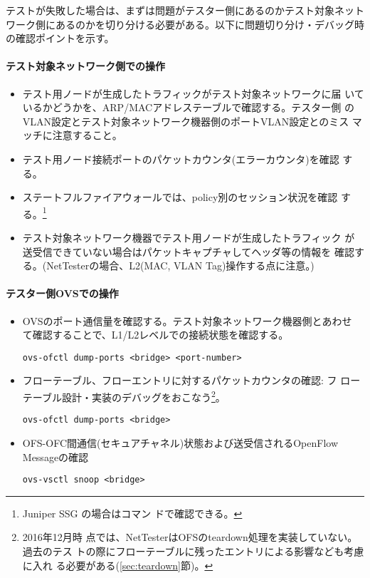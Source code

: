 テストが失敗した場合は、まずは問題がテスター側にあるのかテスト対象ネット
ワーク側にあるのかを切り分ける必要がある。以下に問題切り分け・デバッグ時
の確認ポイントを示す。

    \paragraph{テスト対象ネットワーク側での操作}

\begin{itemize}
 \item テスト用ノードが生成したトラフィックがテスト対象ネットワークに届
       いているかどうかを、ARP/MACアドレステーブルで確認する。テスター側
       のVLAN設定とテスト対象ネットワーク機器側のポートVLAN設定とのミス
       マッチに注意すること。
 \item テスト用ノード接続ポートのパケットカウンタ(エラーカウンタ)を確認
       する。
 \item ステートフルファイアウォールでは、policy別のセッション状況を確認
       する。\footnote{Juniper SSG の場合はコマン
       ドで確認できる。}
 \item テスト対象ネットワーク機器でテスト用ノードが生成したトラフィック
       が送受信できていない場合はパケットキャプチャしてヘッダ等の情報を
       確認する。(NetTesterの場合、L2(MAC, VLAN Tag)操作する点に注意。)
\end{itemize}

    \paragraph{テスター側OVSでの操作}

\begin{itemize}
 \item OVSのポート通信量を確認する。テスト対象ネットワーク機器側とあわせ
       て確認することで、L1/L2レベルでの接続状態を確認する。
\begin{lstlisting}
ovs-ofctl dump-ports <bridge> <port-number>
\end{lstlisting}
 \item フローテーブル、フローエントリに対するパケットカウンタの確認: フ
       ローテーブル設計・実装のデバッグをおこなう\footnote{2016年12月時
       点では、NetTesterはOFSのteardown処理を実装していない。過去のテス
       トの際にフローテーブルに残ったエントリによる影響なども考慮に入れ
       る必要がある(\ref{sec:teardown}節)。}。
\begin{lstlisting}
ovs-ofctl dump-ports <bridge>
\end{lstlisting}
 \item OFS-OFC間通信(セキュアチャネル)状態および送受信されるOpenFlow
       Messageの確認
\begin{lstlisting}
ovs-vsctl snoop <bridge>
\end{lstlisting}
\end{itemize}

